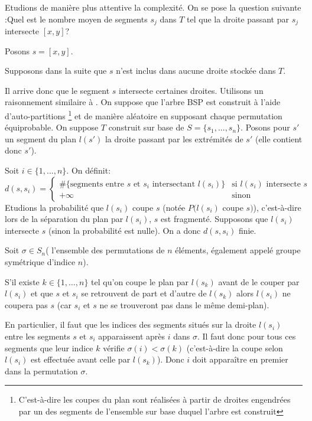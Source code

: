 Etudions de manière plus attentive la complexité. On se pose la
question suivante :\og Quel est le nombre moyen de segments
$s_j$ dans $T$ tel que la droite passant par $s_j$ intersecte
$[x,y]$?\fg

Posons $s = [x,y]$.

Supposons dans la suite que $s$ n'est inclus dans aucune droite
stockée dans $T$.

Il arrive donc que le segment $s$ intersecte certaines droites.
Utilisons un raisonnement similaire à
\cite{berg_cheong_kreveld_2008}. On suppose que
l'arbre BSP est construit à l'aide d'auto-partitions
\footnote{
  C'est-à-dire les coupes du plan sont réalisées à partir de
  droites engendrées par un des segments de l'ensemble sur
  base duquel l'arbre est construit}
et de manière aléatoire en supposant chaque permutation
équiprobable. On suppose $T$ construit sur base de
$S = \{s_1,...,s_n\}$. Posons pour $s'$ un segment du plan $l(s')$
la droite passant par les extrémités de $s'$ (elle contient donc
$s'$).

Soit $ i \in \{1,...,n\}$. On définit:
$$ d(s,s_i )= \begin{cases}
  \mbox{\#\{segments entre } s \mbox{ et } s_i
  \mbox{ intersectant } l(s_i) \mbox{\}}
  &\mbox{si } l(s_i) \mbox { intersecte } s \\
  +\infty & \mbox{sinon} \end{cases} $$
Etudions la probabilité que $l(s_i)$ coupe $s$ (notée
$P(l(s_i)$ coupe $s)$), c'est-à-dire lors de la séparation du
plan par $l(s_i)$, $s$ est fragmenté. Supposons que $l(s_i)$ intersecte
$s$ (sinon la probabilité est nulle). On a donc $d(s, s_i)$ finie.

Soit $\sigma  \in S_n $( l'ensemble des permutations de $n$
éléments, également appelé groupe symétrique d'indice $n$).

S'il existe $k\in\{1, \ldots, n\} $ tel qu'on coupe le plan par
$l(s_k)$ avant de le couper par $l(s_i)$ et que $s$ et $s_i$ se
retrouvent de part et d'autre de $l(s_k)$ alors $l(s_i)$ ne
coupera pas $s$ (car $s_i$ et $s$ ne se trouveront pas dans le
même demi-plan).

En particulier, il faut que les indices des segments situés sur
la droite $l(s_i)$ entre les segments $s$ et $s_i$ apparaissent
après $i$ dans $\sigma$. Il faut donc pour
tous ces segments que leur indice $k$ vérifie
$\sigma(i)<\sigma(k)$ (c'est-à-dire la coupe selon
$l(s_i)$ est effectuée avant celle par $l(s_k)$). Donc $i$ doit
apparaître en premier dans la permutation $\sigma$.


